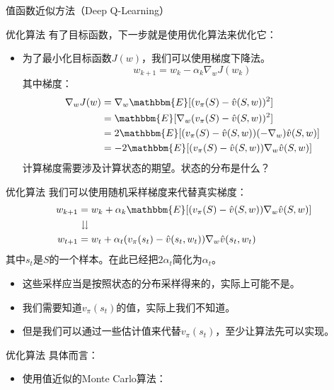 \begin{section}{值函数近似方法\alert{（Deep Q-Learning）}}
\begin{frame}{优化算法}
    有了目标函数，下一步就是使用优化算法来优化它：
    \begin{itemize}
        \item 为了最小化目标函数$J(w)$，我们可以使用\alert{梯度下降法}。
        \[
            w_{k+1}=w_k-\alpha_k\nabla_w J(w_k)
        \]
        其中梯度：
        \[
            \begin{aligned}
                \nabla_w J(w)&=\nabla_w\mathbbm{E}[(v_\pi(S)-\hat{v}(S,w))^2] \\
                &=\mathbbm{E}[\nabla_w(v_\pi(S)-\hat{v}(S,w))^2]\\
                &=2\mathbbm{E}[(v_\pi(S)-\hat{v}(S,w))(-\nabla_w)\hat{v}(S,w)]\\
                &=-2\mathbbm{E}[(v_\pi(S)-\hat{v}(S,w))\nabla_w\hat{v}(S,w)]
            \end{aligned}
        \]
        计算梯度需要涉及计算状态的期望。状态的分布是什么？
    \end{itemize}
\end{frame}

\begin{frame}{优化算法}
    我们可以使用随机采样梯度来代替真实梯度：
    \[
        \begin{aligned}
            w_{k+1}&=w_k+\alpha_k\mathbbm{E}[(v_\pi(S)-\hat{v}(S,w))\nabla_w\hat{v}(S,w)] \\
            &\downdownarrows \\
            w_{t+1}&=w_t+\alpha_t(v_\pi(s_t)-\hat{v}(s_t,w_t))\nabla_w\hat{v}(s_t,w_t)
        \end{aligned}
    \]
    其中$s_t$是$S$的一个样本。在此已经把$2\alpha_t$简化为$\alpha_t$。
    \begin{itemize}
        \item 这些采样应当是按照状态的分布采样得来的，实际上可能不是。
        \item 我们需要知道$v_\pi(s_t)$的值，实际上我们不知道。
        \item 但是我们可以通过一些估计值来代替$v_\pi(s_t)$，至少让算法先可以实现。
    \end{itemize}
\end{frame}

\begin{frame}{优化算法}
    具体而言：
    \begin{itemize}
        \item 使用值近似的Monte Carlo算法：
        

\end{itemize}
\end{frame}
\end{section}
